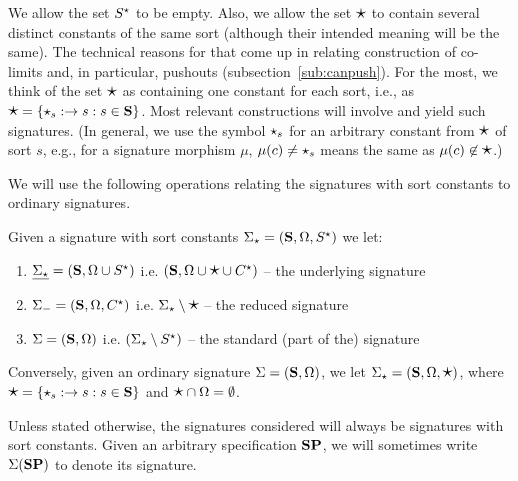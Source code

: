 We allow the set $S^\star$ to be empty. Also, we allow the set
$\mbox{\Large{$\star$}}$ to contain several distinct constants of the same sort (although
their intended meaning will be the same).
The technical reasons for that come up in relating construction of co-limits
and, in particular, pushouts
(subsection~\ref{sub:canpush}). For the most, we think of the set
$\mbox{\Large{$\star$}}$ as containing one constant for each sort, i.e., as
$\mbox{\Large{$\star$}}=\{\star_s:\to s : s\in{\bf S}\}$. Most relevant constructions will
involve and yield such signatures. (In general, we use the symbol $\star_s$
for an arbitrary constant from $\mbox{\Large{$\star$}}$ of sort $s$, e.g., for a signature
morphism $\mu$, 
$\mu(c)\not=\star_s$ means the same as $\mu(c)\not\in\mbox{\Large{$\star$}}$.)


We will use the following operations relating the signatures with sort
 constants to ordinary signatures.

\begin{definition}\label{def:sigops}
Given a signature with sort constants $\Sigma_\star=({\bf S},\Omega,S^\star)$ we let:
\begin{enumerate}\MyLPar
\item $\underline{\Sigma_\star}=({\bf S},\Omega \cup S^\star)$
i.e. $({\bf S}, \Omega \cup \mbox{\Large{$\star$}} \cup C^\star)$ -- the underlying signature
\item ${\Sigma_-}=({\bf S},\Omega,C^\star)$ i.e. $\Sigma_\star
\setminus \mbox{\Large{$\star$}}$ -- the reduced signature
\item ${\Sigma}=({\bf S},\Omega)$ i.e. $(\Sigma_\star
\setminus S^\star)$ -- the standard (part of the) signature
\end{enumerate}
Conversely, given an ordinary signature $\Sigma=({\bf S},\Omega)$, we let
${\Sigma_\star}=({\bf S},\Omega,\mbox{\Large{$\star$}})$, 
 where   $\mbox{\Large{$\star$}}=\{\star_s:\to s:s\in{\bf S}\}$ and $\mbox{\Large{$\star$}}\cap\Omega=\emptyset$.
\end{definition}
%
Unless stated otherwise, the signatures considered will always be signatures with sort constants. 
Given an arbitrary specification ${\bf SP}$, we will sometimes write
$\Sigma({\bf SP})$ to denote its signature.

